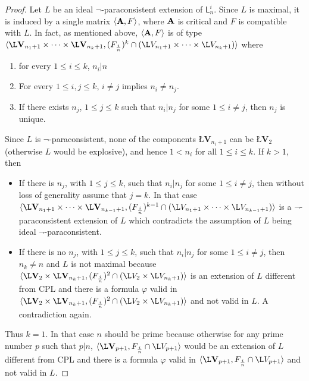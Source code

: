 \documentclass{article}
\theoremstyle{definition}
\newcommand{\algLfin}{\textbf{\L}\mathbf{V}}
\newcommand{\domLfin}{{\L}V}
\begin{document}
\begin{proof}
Let $L$ be an ideal  $\neg$-paraconsistent extension of $\mathsf{L}_{n}^{i}$. Since $L$ is maximal, it is induced by a single matrix $\langle{\bf A}, F\rangle$, where $\bf A$ is critical and $F$ is compatible with $L$. In fact, as mentioned above, $\langle{\bf A}, F\rangle$ is of type $\langle\algLfin_{n_{1}+1}\times\cdots\times\algLfin_{n_{k}+1}, (F_{\frac{i}{n}})^{k}\cap (\domLfin_{n_{1}+1}\times\cdots\times \domLfin_{n_{k}+1})\rangle$ where
\begin{enumerate}
 \item for every $1\leq i\leq k$, $n_{i}|n$
 \item For every $1\leq i, j\leq k$, $ i\neq j$ implies $ n_{i}\neq n_{j}$.
 \item If there exists $n_{j}$, $1\leq j\leq k$ such that $n_{i}|n_{j}$ for some
  $1\leq i\neq j$, then $n_{j}$ is unique.
\end{enumerate}
Since $L$ is $\neg$-paraconsistent, none of the components $\algLfin_{n_{i}+1}$ can be $\algLfin_{2}$ (otherwise $L$ would be explosive), and hence $1<n_{i}$ for all $1\leq i\leq k$.
If $k>1$, then

\begin{itemize}
 \item If there is $n_{j}$, with $1\leq j\leq k$, such that $n_{i}|n_{j}$ for some
  $1\leq i\neq j$, then without loss of generality assume that $j=k$. In that case $\langle \algLfin_{n_{1}+1}\times\cdots\times\algLfin_{n_{k-1}+1}, (F_{\frac{i}{n}})^{k-1}\cap (\domLfin_{n_{1}+1}\times\cdots\times \domLfin_{n_{k-1}+1})\rangle$ is a $\neg$-paraconsistent extension of $L$ which contradicts the assumption of $L$ being ideal $\neg$-paraconsistent.
 \item If there is no $n_{j}$, with $1\leq j\leq k$, such that $n_{i}|n_{j}$ for some
  $1\leq i\neq j$, then $n_{k}\neq n$ and $L$ is not maximal because $\langle \algLfin_{2}\times\algLfin_{n_{k}+1}, (F_{\frac{i}{n}})^{2}\cap (\domLfin_{2}\times \domLfin_{n_{k}+1})\rangle$ is an extension of $L$ different from CPL and there is a formula $\varphi$ valid in $\langle \algLfin_{2}\times\algLfin_{n_{k}+1}, (F_{\frac{i}{n}})^{2}\cap (\domLfin_{2}\times \domLfin_{n_{k}+1})\rangle$ and not valid in $L$. A contradiction again.
  \end{itemize}
  Thus $k=1$. In that case $n$ should be prime because otherwise for any prime number $p$ such that $p|n$, $\langle\algLfin_{p+1}, F_{\frac{i}{n}}\cap \domLfin_{p+1}\rangle$ would be an extension of $L$ different from CPL and there is a formula $\varphi$ valid in $\langle\algLfin_{p+1}, F_{\frac{i}{n}}\cap \domLfin_{p+1}\rangle$ and not valid in $L$.
 \end{proof}
\end{document}
